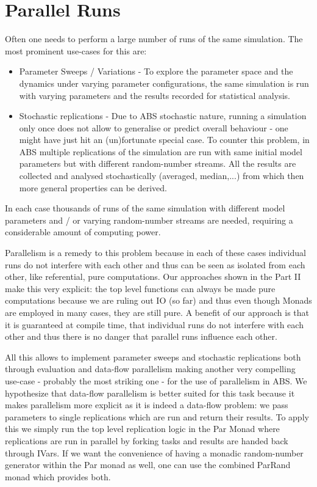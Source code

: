 \section{Parallel Runs}
Often one needs to perform a large number of runs of the same simulation. The most prominent use-cases for this are:

\begin{itemize}
	\item Parameter Sweeps / Variations - To explore the parameter space and the dynamics under varying parameter configurations, the same simulation is run with varying parameters and the results recorded for statistical analysis.
	
	\item Stochastic replications - Due to ABS stochastic nature, running a simulation only once does not allow to generalise or predict overall behaviour - one might have just hit an (un)fortunate special case. To counter this problem, in ABS multiple replications of the  simulation are run with same initial model parameters but with different random-number streams. All the results are collected and analysed stochastically (averaged, median,...) from which then more general properties can be derived.
\end{itemize}

In each case thousands of runs of the same simulation with different model parameters and / or varying random-number streams are needed, requiring a considerable amount of computing power.

Parallelism is a remedy to this problem because in each of these cases individual runs do not interfere with each other and thus can be seen as isolated from each other, like referential, pure computations. Our approaches shown in the Part II make this very explicit: the top level functions can always be made pure computations because we are ruling out IO (so far) and thus even though Monads are employed in many cases, they are still pure. A benefit of our approach is that it is guaranteed at compile time, that individual runs do not interfere with each other and thus there is no danger that parallel runs influence each other. 

All this allows to implement parameter sweeps and stochastic replications both through evaluation and data-flow parallelism making another very compelling use-case - probably the most striking one - for the use of parallelism in ABS. We hypothesize that data-flow parallelism is better suited for this task because it makes parallelism more explicit as it is indeed a data-flow problem: we pass parameters to single replications which are run and return their results. To apply this we simply run the top level replication logic in the Par Monad where replications are run in parallel by forking tasks and results are handed back through IVars. If we want the convenience of having a monadic random-number generator within the Par monad as well, one can use the combined ParRand monad which provides both.